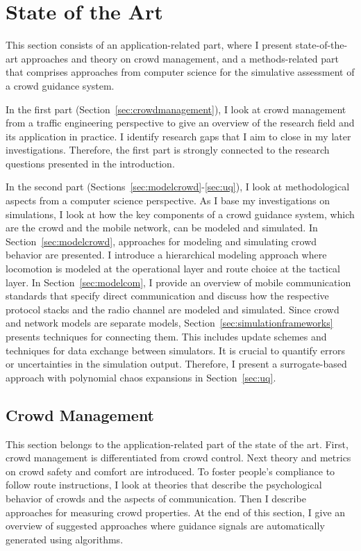 

\chapter{State of the Art}
\label{sec:state}

This section consists of an application-related part, where I present state-of-the-art approaches and theory on crowd management, and a methods-related part that comprises approaches from computer science for the simulative assessment of a crowd guidance system.


In the first part (Section~\ref{sec:crowdmanagement}), I look at crowd management from a traffic engineering perspective to give an overview of the research field and its application in practice. I identify research gaps that I aim to close in my later investigations. Therefore, the first part is strongly connected to the research questions presented in the introduction. 


In the second part (Sections~\ref{sec:modelcrowd}-\ref{sec:uq}), I look at methodological aspects from a computer science perspective. As I base my investigations on simulations, I look at how the key components of a crowd guidance system, which are the crowd and the mobile network, can be modeled and simulated. In Section~\ref{sec:modelcrowd}, approaches for modeling and simulating crowd behavior are presented. I introduce a hierarchical modeling approach where locomotion is modeled at the operational layer and route choice at the tactical layer. In Section~\ref{sec:modelcom}, I provide an overview of mobile communication standards that specify direct communication and discuss how the respective protocol stacks and the radio channel are modeled and simulated.  
Since crowd and network models are separate models, Section~\ref{sec:simulationframeworks} presents techniques for connecting them. This includes update schemes and techniques for data exchange between simulators. 
It is crucial to quantify errors or uncertainties in the simulation output. Therefore, I present a surrogate-based approach with polynomial chaos expansions in Section~\ref{sec:uq}. 



\section{Crowd Management}

This section belongs to the application-related part of the state of the art. First, crowd management is differentiated from crowd control. Next theory and metrics on crowd safety and comfort are introduced. To foster people's compliance to follow route instructions, I look at theories that describe the psychological behavior of crowds and the aspects of communication. Then I describe approaches for measuring crowd properties. At the end of this section, I give an overview of suggested approaches where guidance signals are automatically generated using algorithms. 


